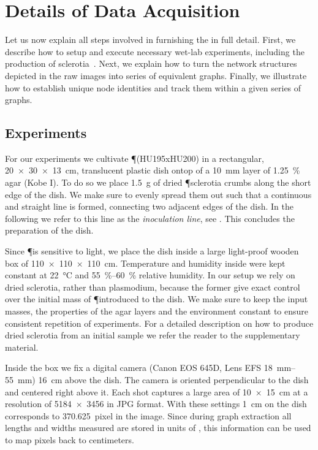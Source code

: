 
\chapter{Details of Data Acquisition}\label{app:smgr}

	Let us now explain all steps involved in furnishing the \data in full detail. First, we describe how to setup and execute necessary wet-lab experiments, including the production of sclerotia~\cite{lifecycle}. Next, we explain how to turn the network structures depicted in the raw images into series of equivalent graphs. Finally, we illustrate how to establish unique node identities and track them within a given series of graphs.

	\section{Experiments}

		For our experiments we cultivate \P (HU195xHU200) in a rectangular, \SI{20 x 30 x 13}{\centi\metre}, translucent plastic dish ontop of a \SI{10}{\milli\metre} layer of \SI{1.25}{\percent} agar (Kobe I). To do so we place \SI{1.5}{\gram} of dried \P sclerotia crumbs along the short edge of the dish. We make sure to evenly spread them out such that a continuous and straight line is formed, connecting two adjacent edges of the dish. In the following we refer to this line as the \emph{inoculation line}, see . This concludes the preparation of the dish. 

		Since \P is sensitive to light, we place the dish inside a large light-proof wooden box of \SI{110 x 110 x 110}{\centi\metre}. Temperature and humidity inside were kept constant at \SI{22}{\celsius} and \SIrange{55}{60}{\percent} relative humidity. In our setup we rely on dried sclerotia, rather than plasmodium, because the former give exact control over the initial mass of \P introduced to the dish. We make sure to keep the input masses, the properties of the agar layers and the environment constant to ensure consistent repetition of experiments. For a detailed description on how to produce dried sclerotia from an initial sample we refer the reader to the supplementary material.

		Inside the box we fix a digital camera (Canon EOS 645D, Lens EFS \SIrange{18}{55}{\milli\metre}) \SI{16}{\centi\metre} above the dish. The camera is oriented perpendicular to the dish and centered right above it. Each shot captures a large area of \SI{10 x 15}{\centi\metre} at a resolution of \SI{5184 x 3456}{\pixel} in JPG format. With these settings \SI{1}{\centi\metre} on the dish corresponds to \SI{370.625}{pixel} in the image. Since during graph extraction all lengths and widths measured are stored in units of \si{\pixel}, this information can be used to map pixels back to centimeters.


